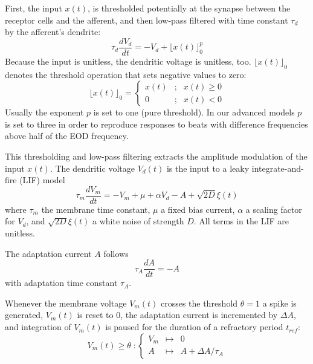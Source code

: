 \documentclass[12pt,a4paper]{article}
\begin{document}
First, the input $x(t)$, is thresholded potentially at the synapse between the receptor cells and the afferent, and then low-pass filtered  with time constant $\tau_{d}$ by the afferent's dendrite:
\begin{equation}
  \label{dendrite}
  \tau_{d} \frac{d V_{d}}{d t} = -V_{d}+  \lfloor x(t) \rfloor_{0}^{p}
\end{equation}
Because the input is unitless, the dendritic voltage is unitless, too. $\lfloor x(t) \rfloor_{0}$ denotes the threshold operation that sets negative values to zero:
\begin{equation}
  \label{threshold}
  \lfloor x(t) \rfloor_0 = \left\{ \begin{array}{rcl} x(t) & ; & x(t) \ge 0 \\ 0 & ; & x(t) < 0 \end{array} \right.
\end{equation}
Usually the exponent $p$ is set to one (pure threshold). In our advanced models $p$ is set to three in order to reproduce responses to beats with difference frequencies above half of the EOD frequency.

This thresholding and low-pass filtering extracts the amplitude modulation of the input $x(t)$. The dendritic voltage $V_d(t)$ is the input to a leaky integrate-and-fire (LIF) model
\begin{equation}
  \label{LIF}
  \tau_{m} \frac{d V_{m}}{d t}  = - V_{m} + \mu + \alpha V_{d} - A + \sqrt{2D}\xi(t)
\end{equation}
where $\tau_{m}$ the membrane time constant, $\mu$ a fixed bias current, $\alpha$ a scaling factor for $V_{d}$, and $\sqrt{2D}\xi(t)$ a white noise of strength $D$. All terms in the LIF are unitless.

The adaptation current $A$ follows
\begin{equation}
  \label{adaptation}
  \tau_{A} \frac{d A}{d t} = - A
\end{equation}
with adaptation time constant $\tau_A$.

Whenever the membrane voltage $V_m(t)$ crosses the threshold $\theta=1$ a spike is generated, $V_{m}(t)$ is reset to $0$, the adaptation current is incremented by $\Delta A$, and integration of $V_m(t)$ is paused for the duration of a refractory period $t_{ref}$:
\begin{equation}
  \label{spikethresh}
  V_m(t) \ge \theta \; : \left\{ \begin{array}{rcl} V_m & \mapsto & 0 \\ A  & \mapsto & A + \Delta A/\tau_A \end{array} \right.
\end{equation}
\end{document}
